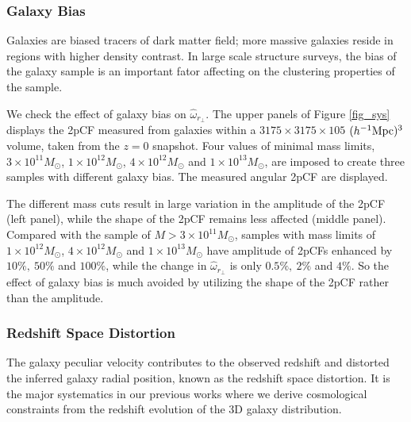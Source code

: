 \documentclass[iop]{emulateapj}
\begin{document}


\subsubsection{Galaxy Bias}

Galaxies are biased tracers of dark matter field;
more massive galaxies reside in regions with higher density contrast.
In large scale structure surveys, the bias of the galaxy sample is an important fator affecting on the clustering properties of the sample.

We check the effect of galaxy bias on $\hat \omega_{r_\perp}$.
The upper panels of Figure \ref{fig_sys} displays the 2pCF measured from galaxies within a $3175\times3175\times105$ $(h^{-1}\rm Mpc)^3$ volume, taken from the $z=0$ snapshot.
Four values of minimal mass limits, $3\times 10^{11} M_{\odot}$, $1\times 10^{12} M_{\odot}$, $4\times 10^{12} M_{\odot}$ and $1\times 10^{13} M_{\odot}$,
are imposed to create three samples with different galaxy bias.
The measured angular 2pCF are displayed.

The different mass cuts result in large variation in the amplitude of the 2pCF (left panel),
while the shape of the 2pCF remains less affected (middle panel).
Compared with the sample of $M>3\times 10^{11} M_{\odot}$,
samples with mass limits of $1\times 10^{12} M_{\odot}$, $4\times 10^{12} M_{\odot}$ and $1\times 10^{13} M_{\odot}$
have amplitude of 2pCFs enhanced by $10\%,\ 50\%$ and $100\%$,
while the change in $\hat\omega_{r_\perp}$ is only $0.5\%,\ 2\%$ and $4\%$.
So the effect of galaxy bias is much avoided by utilizing the shape of the 2pCF rather than the amplitude.

\subsubsection{Redshift Space Distortion}

The galaxy peculiar velocity contributes to the observed redshift and distorted the inferred galaxy radial position,
known as the redshift space distortion.
It is the major systematics in our previous works \citep{Li2014,Li2015,Li2016}
where we derive cosmological constraints from the redshift evolution of the 3D galaxy distribution.
\end{document}
